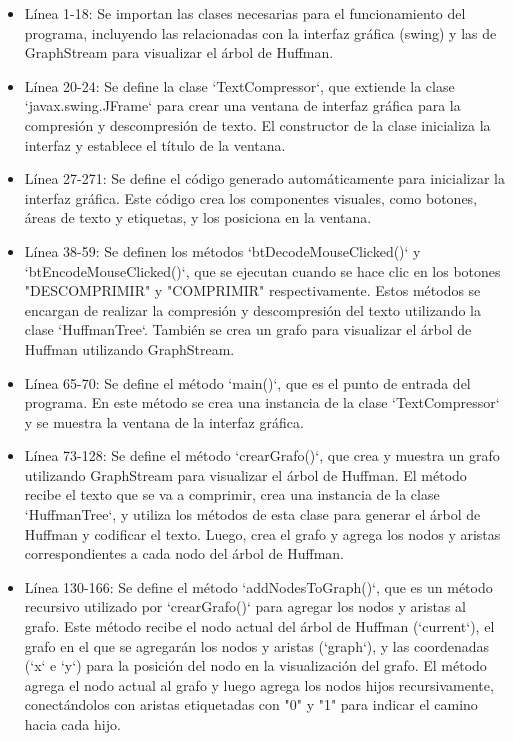 \documentclass{article}
\begin{document}
	
\begin{itemize}
	\item Línea 1-18: Se importan las clases necesarias para el funcionamiento del programa, incluyendo las relacionadas con la interfaz gráfica (swing) y las de GraphStream para visualizar el árbol de Huffman.

\item Línea 20-24: Se define la clase `TextCompressor`, que extiende la clase `javax.swing.JFrame` para crear una ventana de interfaz gráfica para la compresión y descompresión de texto. El constructor de la clase inicializa la interfaz y establece el título de la ventana.

\item Línea 27-271: Se define el código generado automáticamente para inicializar la interfaz gráfica. Este código crea los componentes visuales, como botones, áreas de texto y etiquetas, y los posiciona en la ventana.

\item Línea 38-59: Se definen los métodos `btDecodeMouseClicked()` y `btEncodeMouseClicked()`, que se ejecutan cuando se hace clic en los botones "DESCOMPRIMIR" y "COMPRIMIR" respectivamente. Estos métodos se encargan de realizar la compresión y descompresión del texto utilizando la clase `HuffmanTree`. También se crea un grafo para visualizar el árbol de Huffman utilizando GraphStream.

\item Línea 65-70: Se define el método `main()`, que es el punto de entrada del programa. En este método se crea una instancia de la clase `TextCompressor` y se muestra la ventana de la interfaz gráfica.

\item Línea 73-128: Se define el método `crearGrafo()`, que crea y muestra un grafo utilizando GraphStream para visualizar el árbol de Huffman. El método recibe el texto que se va a comprimir, crea una instancia de la clase `HuffmanTree`, y utiliza los métodos de esta clase para generar el árbol de Huffman y codificar el texto. Luego, crea el grafo y agrega los nodos y aristas correspondientes a cada nodo del árbol de Huffman.

\item Línea 130-166: Se define el método `addNodesToGraph()`, que es un método recursivo utilizado por `crearGrafo()` para agregar los nodos y aristas al grafo. Este método recibe el nodo actual del árbol de Huffman (`current`), el grafo en el que se agregarán los nodos y aristas (`graph`), y las coordenadas (`x` e `y`) para la posición del nodo en la visualización del grafo. El método agrega el nodo actual al grafo y luego agrega los nodos hijos recursivamente, conectándolos con aristas etiquetadas con "0" y "1" para indicar el camino hacia cada hijo.


\end{itemize}
\end{document}

